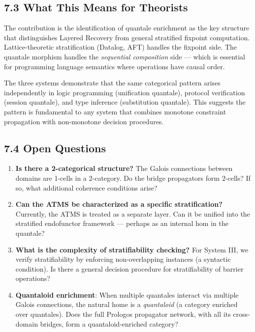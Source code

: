 \documentclass[11pt]{article}
\begin{document}
\subsection{7.3 What This Means for Theorists}
\label{sec:org4c0648c}

The contribution is the identification of quantale enrichment as the key
structure that distinguishes Layered Recovery from general stratified fixpoint
computation. Lattice-theoretic stratification (Datalog, AFT) handles the
fixpoint side. The quantale morphism handles the \emph{sequential composition} side —
which is essential for programming language semantics where operations have
causal order.

The three systems demonstrate that the same categorical pattern arises
independently in logic programming (unification quantale), protocol verification
(session quantale), and type inference (substitution quantale). This suggests
the pattern is fundamental to any system that combines monotone constraint
propagation with non-monotone decision procedures.
\subsection{7.4 Open Questions}
\label{sec:orgc61c6f5}

\begin{enumerate}
\item \textbf{Is there a 2-categorical structure?} The Galois connections between domains
are 1-cells in a 2-category. Do the bridge propagators form 2-cells? If so,
what additional coherence conditions arise?

\item \textbf{Can the ATMS be characterized as a specific stratification?} Currently, the
ATMS is treated as a separate layer. Can it be unified into the stratified
endofunctor framework — perhaps as an internal hom in the quantale?

\item \textbf{What is the complexity of stratifiability checking?} For System III, we
verify stratifiability by enforcing non-overlapping instances (a syntactic
condition). Is there a general decision procedure for stratifiability of
barrier operations?

\item \textbf{Quantaloid enrichment}: When multiple quantales interact via multiple Galois
connections, the natural home is a \emph{quantaloid} (a category enriched over
quantales). Does the full Prologos propagator network, with all its
cross-domain bridges, form a quantaloid-enriched category?
\end{enumerate}
\end{document}
